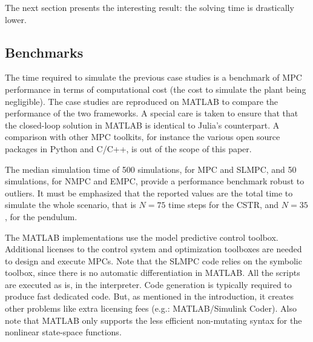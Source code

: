 The next section presents the interesting result: the solving time is drastically lower.

\subsection{Benchmarks}
\label{sec:benchmarks}

The time required to simulate the previous case studies is a benchmark of MPC performance in terms of computational cost (the cost to simulate the plant being negligible). The case studies are reproduced on MATLAB to compare the performance of the two frameworks. A special care is taken to ensure that that the closed-loop solution in MATLAB is identical to Julia’s counterpart. A comparison with other MPC toolkits, for instance the various open source packages in Python and C/C++, is out of the scope of this paper.

The median simulation time of 500 simulations, for MPC and SLMPC, and 50 simulations, for NMPC and EMPC, provide a performance benchmark robust to outliers. It must be emphasized that the reported values are the total time to simulate the whole scenario, that is $N=75$ time steps for the CSTR, and $N=35$, for the pendulum.

The MATLAB implementations use the model predictive control toolbox. Additional licenses to the control system and optimization toolboxes are needed to design and execute MPCs. Note that the SLMPC code relies on the symbolic toolbox, since there is no automatic differentiation in MATLAB. All the scripts are executed as is, in the interpreter. Code generation is typically required to produce fast dedicated code. But, as mentioned in the introduction, it creates other problems like extra licensing fees (e.g.: MATLAB/Simulink Coder). Also note that MATLAB only supports the less efficient non-mutating syntax for the nonlinear state-space functions.

